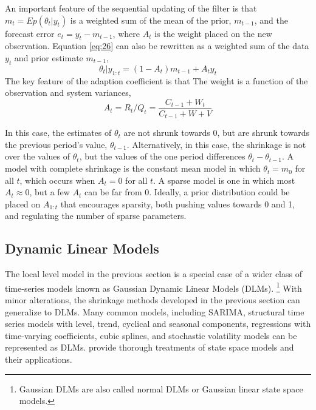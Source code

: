 \documentclass{article}
\begin{document}
An important feature of the sequential updating of the filter is that $m_{t} = E p(\theta_{t} | y_{t})$ is a weighted sum of the mean of the prior,  $m_{t - 1}$, and the forecast error $e_{t} = y_{t} - m_{t - 1}$, where $A_{t}$ is the weight placed on the new observation.
Equation \eqref{eq:26} can also be rewritten as a weighted sum of the data $y_{t}$ and prior estimate $m_{t-1}$, 
\begin{equation}
  \label{eq:18}
  \theta_{t} | y_{1:t} = (1 - A_{t}) m_{t-1} + A_{t} y_{t}
\end{equation}
The key feature of the adaption coefficient is that 
The weight is a function of the observation and system variances, 
\begin{equation}
  \label{eq:24}
  A_{t} = R_{t} / Q_{t} = \frac{C_{t-1} + W_{t}}{C_{t-1} + W + V}
\end{equation}

In this case, the estimates of $\theta_{t}$ are not shrunk towards 0, but are shrunk towards the previous period's value, $\theta_{t-1}$.
Alternatively, in this case, the shrinkage is not over the values of $\theta_{t}$, but the values of the one period differences $\theta_{t} - \theta_{t -1}$.
A model with complete shrinkage is the constant mean model in which $\theta_{t} = m_{0}$ for all $t$, which occurs when $A_{t} = 0$ for all $t$.
A sparse model is one in which most $A_{t} \approx 0$, but a few $A_{t}$ can be far from 0.
Ideally, a prior distribution could be placed on $A_{1:t}$ that encourages sparsity, both pushing values towards 0 and 1, and regulating the number of sparse parameters.

\subsection{Dynamic Linear Models}
\label{sec:dynam-line-models}

The local level model in the previous section is a special case of a wider class of time-series models known as Gaussian Dynamic Linear Models (DLMs).%
\footnote{Gaussian DLMs are also called normal DLMs or Gaussian linear state space models.}
With minor alterations, the shrinkage methods developed in the previous section can generalize to DLMs.
Many common models, including SARIMA, structural time series models with level, trend, cyclical and seasonal components, regressions with time-varying coefficients, cubic splines, and stochastic volatility models can be represented as DLMs. 
\textcites{WestHarrison1997}{DurbinKoopman2001}{CommandeurKoopman2007}{PetrisPetroneOmegal2009}{ShumwayStoffer2010} provide thorough treatments of state space models and their applications.
\end{document}
